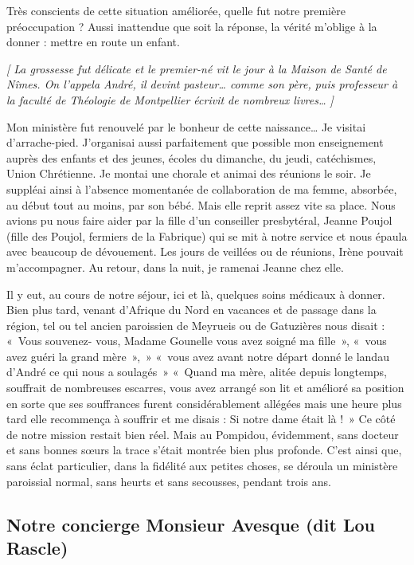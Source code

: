 Très conscients de cette situation améliorée, quelle fut notre première préoccupation ?
Aussi inattendue que soit la réponse, la vérité m’oblige à la donner : mettre en route
un enfant.

\textit{[ La grossesse fut délicate et le premier-né vit le jour à la Maison de Santé de Nîmes. On l’appela
André, il devint pasteur… comme son père, puis professeur à la faculté de Théologie de Montpellier
écrivit de nombreux livres… ]}

Mon ministère fut renouvelé par le bonheur de cette naissance… Je visitai d’arrache-pied. J’organisai aussi parfaitement que possible mon enseignement auprès des enfants et des jeunes, écoles du dimanche, du jeudi, catéchismes, Union Chrétienne.
Je montai une chorale et animai des réunions le soir. Je suppléai ainsi à l’absence
momentanée de collaboration de ma femme, absorbée, au début tout au moins, par
son bébé. Mais elle reprit assez vite sa place. Nous avions pu nous faire aider par la
fille d’un conseiller presbytéral, Jeanne Poujol (fille des Poujol, fermiers de la Fabrique) qui se mit à notre service et nous épaula avec beaucoup de dévouement. Les jours de
veillées ou de réunions, Irène pouvait m’accompagner. Au retour, dans la nuit, je
ramenai Jeanne chez elle.

Il y eut, au cours de notre séjour, ici et là, quelques soins médicaux à donner. Bien
plus tard, venant d’Afrique du Nord en vacances et de passage dans la région, tel ou
tel ancien paroissien de Meyrueis ou de Gatuzières nous disait : «~Vous souvenez-
vous, Madame Gounelle vous avez soigné ma fille~», «~vous avez guéri la grand
mère~»,~» «~vous avez avant notre départ donné le landau d’André ce qui nous a
soulagés~» «~Quand ma mère, alitée depuis longtemps, souffrait de nombreuses
escarres, vous avez arrangé son lit et amélioré sa position en sorte que ses
souffrances furent considérablement allégées mais une heure plus tard elle
recommença à souffrir et me disais : Si notre dame était là !~»
Ce côté de notre mission restait bien réel. Mais au Pompidou, évidemment, sans
docteur et sans bonnes sœurs la trace s’était montrée bien plus profonde.
C’est ainsi que, sans éclat particulier, dans la fidélité aux petites choses, se déroula un
ministère paroissial normal, sans heurts et sans secousses, pendant trois ans.

\subsection{Notre concierge Monsieur Avesque (dit Lou Rascle)}

